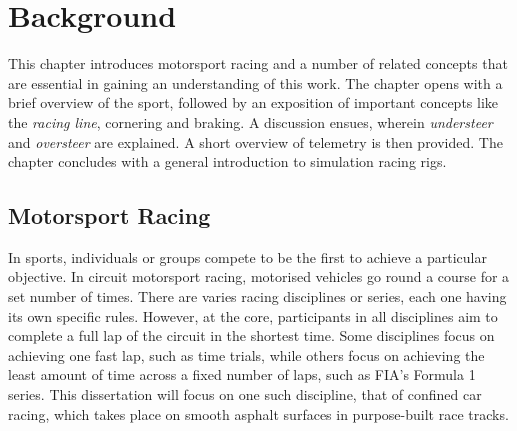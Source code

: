 \chapter{Background}
\label{sec:background}

This chapter introduces motorsport racing and a number of related concepts that are essential in gaining an understanding of this work. The chapter opens with a brief overview of the sport, followed by an exposition of important concepts like the \emph{racing line}, cornering and braking. A discussion ensues, wherein \emph{understeer} and \emph{oversteer} are explained. A short overview of telemetry is then provided. The chapter concludes with a general introduction to simulation racing rigs.

\section{Motorsport Racing}
In sports, individuals or groups compete to be the first to achieve a particular objective. In circuit motorsport racing, motorised vehicles go round a course for a set number of times. There are varies racing disciplines or series, each one having its own specific rules. However, at the core, participants in all disciplines aim to complete a full lap of the circuit in the shortest time. Some disciplines focus on achieving one fast lap, such as time trials, while others focus on achieving the least amount of time across a fixed number of laps, such as FIA's Formula 1 series. This dissertation will focus on one such discipline, that of confined car racing, which takes place on smooth asphalt surfaces in purpose-built race tracks. 

